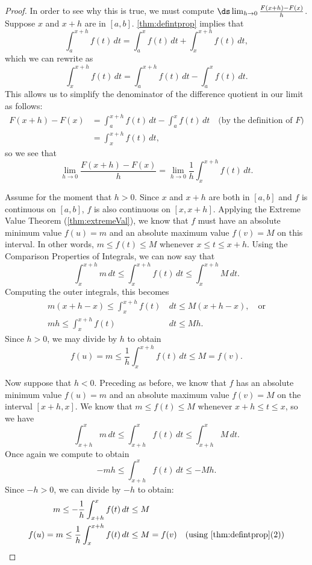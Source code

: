 \begin{proof}
In order to see why this is true, we must compute $\ds\lim_{h\to 0}\frac{F(x+h)-F(x)}{h}$. Suppose $x$ and $x+h$ are in $[a,b]$. \autoref{thm:defintprop} implies that
\[\int_a^{x+h}f(t)\,dt =\int_a^x f(t)\,dt+\int_x^{x+h} f(t)\,dt,\]
which we can rewrite as
\[\int_x^{x+h} f(t)\,dt=\int_a^{x+h} f(t)\,dt-\int_a^x f(t)\,dt.\]
This allows us to simplify the denominator of the difference quotient in our limit as follows:
\begin{align*}
F(x+h)-F(x)
&=\int_a^{x+h} f(t)\,dt-\int_a^x f(t)\,dt \quad\text{(by the definition of $F$)}\\
&=\int_x^{x+h} f(t)\,dt,
\end{align*}
so we see that
\[\lim_{h\to 0}\frac{F(x+h)-F(x)}{h}=\lim_{h\to 0}\frac 1h\int_x^{x+h} f(t)\,dt.\]

Assume for the moment that $h>0$. Since $x$ and $x+h$ are both in $[a,b]$ and $f$ is continuous on $[a,b]$, $f$ is also continuous on $[x,x+h]$. Applying the Extreme Value Theorem (\autoref{thm:extremeVal}), we know that $f$ must have an absolute minimum value $f(u)=m$ and an absolute maximum value $f(v)=M$ on this interval. In other words, $m\leq f(t)\leq M$ whenever $x\leq t\leq x+h$. Using the Comparison Properties of Integrals, we can now say that
\[\int_x^{x+h} m\,dt \leq \int_x^{x+h} f(t)\,dt \leq \int_x^{x+h} M\,dt.\]
Computing the outer integrals, this becomes 
\begin{align*}
m(x+h-x)\leq \int_x^{x+h} f(t)&\,dt \leq M(x+h-x),\quad\text{or}\\
mh\leq \int_x^{x+h} f(t)&\,dt \leq Mh.
\end{align*}
Since $h>0$, we may divide by $h$ to obtain
\[f(u)=m\leq \frac1h\int_x^{x+h} f(t)\,dt \leq M=f(v).\]

Now suppose that $h<0$. Preceding as before, we know that $f$ has an absolute minimum value $f(u)=m$ and an absolute maximum value $f(v)=M$ on the interval $[x+h,x]$. We know that $m\leq f(t)\leq M$ whenever $x+h\leq t\leq x$, so we have \[\int_{x+h}^x m\,dt\leq\int_{x+h}^x f(t)\,dt\leq \int_{x+h}^x M\,dt.\] Once again we compute to obtain \[ -mh\leq \int_{x+h}^x f(t)\,dt \leq -Mh.\]
Since $-h>0$, we can divide by $-h$ to obtain:
\begin{align*}
m\leq -\frac1h\int_{x+h}^x f(t)&\,dt \leq M\\
f(u)=m\leq \frac1h \int_x^{x+h} f(t)&\,dt \leq M=f(v)
\quad\text{(using \autoref{thm:defintprop}(2))}\\
\end{align*}


\end{proof}
